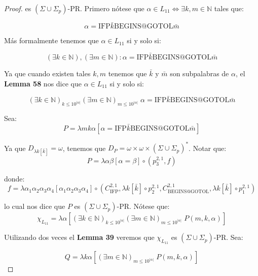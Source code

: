 \begin{proof}
    \PN es $(\Sigma \cup \Sigma_{p})$-PR. Primero nótese que $\alpha \in L_{11} \Leftrightarrow \exists k, m \in
    \mathbb{N}$ tales que:

    \[
      \alpha = \mathrm{IFP}\bar{k}\mathrm{BEGINS}@\mathrm{GOTOL}\bar{m}
    \]

    \PN Más formalmente tenemos que $\alpha \in L_{11}$ si y solo si:

    \[
      (\exists k \in \mathbb{N}), (\exists m \in \mathbb{N}): \alpha = \mathrm{IFP}\bar{k}\mathrm{BEGINS}@
      \mathrm{GOTOL}\bar{m}
    \]

    \PN Ya que cuando existen tales $k, m$ tenemos que $\bar{k}$ y $\bar{m}$ son subpalabras de $\alpha$, el
    \textbf{Lemma 58} nos dice que $\alpha \in L_{11}$ si y solo si:

    \[
      (\exists k \in \mathbb{N})_{k\leq 10^{\lvert \alpha \rvert}}(\exists m \in \mathbb{N})_{m \leq
      10^{\lvert \alpha \rvert}} \; \alpha = \mathrm{IFP}\bar{k}\mathrm{BEGINS}@\mathrm{GOTOL}\bar{m}
    \]

    \PN Sea:
    \[
      P = \lambda mk\alpha \left[\alpha =\mathrm{IFP}\bar{k}\mathrm{BEGINS}@\mathrm{GOTOL}\bar{m}\right]
    \]

    \PN Ya que $D_{\lambda k \left[\bar{k}\right]} = \omega$, tenemos que $D_{P} = \omega \times \omega \times
    (\Sigma \cup \Sigma_{p})^{\ast}$. Notar que:
    \[
      P = \lambda \alpha\beta \left[\alpha =\beta\right] \circ \left(p_{3}^{2,1},f\right)
    \]

    \PN donde:
    \[
      f = \lambda \alpha_{1}\alpha_{2}\alpha_{3}\alpha_{4}\left[\alpha_{1}\alpha_{2}\alpha_{3}\alpha_{4}\right] \circ
      \left(C_{\mathrm{IFP}}^{2,1},\lambda k \left[\bar{k}\right] \circ p_{2}^{2,1},C_{\mathrm{BEGINS}@
      \mathrm{GOTOL}}^{2,1},\lambda k \left[\bar{k}\right] \circ p_{1}^{2,1}\right)
    \]

    \PN lo cual nos dice que $P$ es $(\Sigma \cup \Sigma_{p})$-PR.
    \PN Nótese que:
    \[
      \chi_{L_{11}} = \lambda \alpha \left[(\exists k \in \mathbb{N})_{k\leq 10^{\lvert \alpha \rvert}}(\exists
      m \in \mathbb{N})_{m\leq 10^{\lvert \alpha \rvert}} \; P(m,k,\alpha)\right]
    \]

    \PN Utilizando dos veces el \textbf{Lemma 39} veremos que $\chi_{L_{11}}$ es $(\Sigma \cup \Sigma_{p})$-PR. Sea:

    \[
      Q = \lambda k\alpha \left[(\exists m \in \mathbb{N})_{m\leq 10^{\lvert \alpha \rvert}}\; P(m,k,\alpha)
      \right]
    \]


\end{proof}
